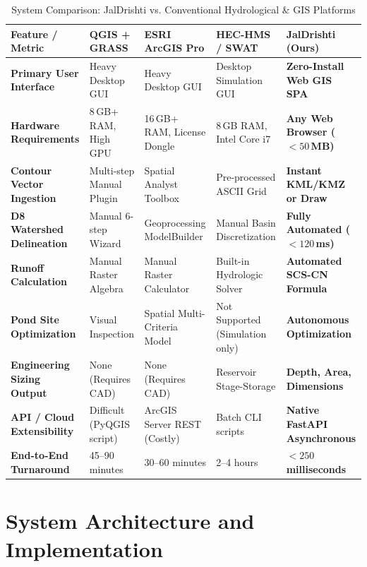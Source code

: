 \documentclass[11pt,a4paper]{article}
\begin{document}
\begin{table}[t]
\centering
\small
\caption{System Comparison: JalDrishti vs. Conventional Hydrological \& GIS Platforms}
\label{tab:comparison}
\vspace{-0.2cm}
\begin{tabularx}{\linewidth}{p{3.2cm}p{2.8cm}p{3.0cm}p{3.4cm}X}
\toprule
\textbf{Feature / Metric} & \textbf{QGIS + GRASS} & \textbf{ESRI ArcGIS Pro} & \textbf{HEC-HMS / SWAT} & \textbf{JalDrishti (Ours)} \\
\midrule
\textbf{Primary User Interface} & Heavy Desktop GUI & Heavy Desktop GUI & Desktop Simulation GUI & \textbf{Zero-Install Web GIS SPA} \\
\textbf{Hardware Requirements} & 8\,GB+ RAM, High GPU & 16\,GB+ RAM, License Dongle & 8\,GB RAM, Intel Core i7 & \textbf{Any Web Browser ($<50$\,MB)} \\
\textbf{Contour Vector Ingestion} & Multi-step Manual Plugin & Spatial Analyst Toolbox & Pre-processed ASCII Grid & \textbf{Instant KML/KMZ or Draw} \\
\textbf{D8 Watershed Delineation} & Manual 6-step Wizard & Geoprocessing ModelBuilder & Manual Basin Discretization & \textbf{Fully Automated ($<120$\,ms)} \\
\textbf{Runoff Calculation} & Manual Raster Algebra & Manual Raster Calculator & Built-in Hydrologic Solver & \textbf{Automated SCS-CN Formula} \\
\textbf{Pond Site Optimization} & Visual Inspection & Spatial Multi-Criteria Model & Not Supported (Simulation only) & \textbf{Autonomous Optimization} \\
\textbf{Engineering Sizing Output}& None (Requires CAD) & None (Requires CAD) & Reservoir Stage-Storage & \textbf{Depth, Area, Dimensions} \\
\textbf{API / Cloud Extensibility}& Difficult (PyQGIS script)& ArcGIS Server REST (Costly) & Batch CLI scripts & \textbf{Native FastAPI Asynchronous} \\
\textbf{End-to-End Turnaround}   & 45--90 minutes & 30--60 minutes & 2--4 hours & \textbf{$<250$ milliseconds} \\
\bottomrule
\end{tabularx}
\end{table}

\section{System Architecture and Implementation}
\label{sec:architecture}
\end{document}
